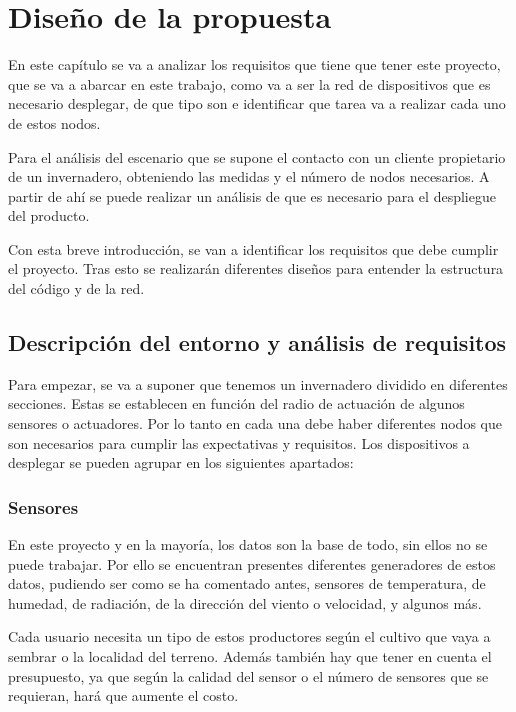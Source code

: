 \chapter{Diseño de la propuesta}

En este capítulo se va a analizar los requisitos que tiene que tener este proyecto, que se va a abarcar en este trabajo, como va a ser la red de dispositivos que es necesario desplegar, de que tipo son e identificar que tarea va a realizar cada uno de estos nodos.

Para el análisis del escenario que se supone el contacto con un cliente propietario de un invernadero, obteniendo las medidas y el número de nodos necesarios. A partir de ahí se puede realizar un análisis de que es necesario para el despliegue del producto.

Con esta breve introducción, se van a identificar los requisitos que debe cumplir el proyecto. Tras esto se realizarán diferentes diseños para entender la estructura del código y de la red.

\section{Descripción del entorno y análisis de requisitos}

Para empezar, se va a suponer que tenemos un invernadero dividido en diferentes secciones. Estas se establecen en función del radio de actuación de algunos sensores o actuadores. Por lo tanto en cada una debe haber diferentes nodos que son necesarios para cumplir las expectativas y requisitos. Los dispositivos a desplegar se pueden agrupar en los siguientes apartados:

\subsection{Sensores}

En este proyecto y en la mayoría, los datos son la base de todo, sin ellos no se puede trabajar. Por ello se encuentran presentes diferentes generadores de estos datos, pudiendo ser como se ha comentado antes, sensores de temperatura, de humedad, de radiación, de la dirección del viento o velocidad, y algunos más.


Cada usuario necesita un tipo de estos productores según el cultivo que vaya a sembrar o la localidad del terreno. Además también hay que tener en cuenta el presupuesto, ya que según la calidad del sensor o el número de sensores que se requieran, hará que aumente el costo.


